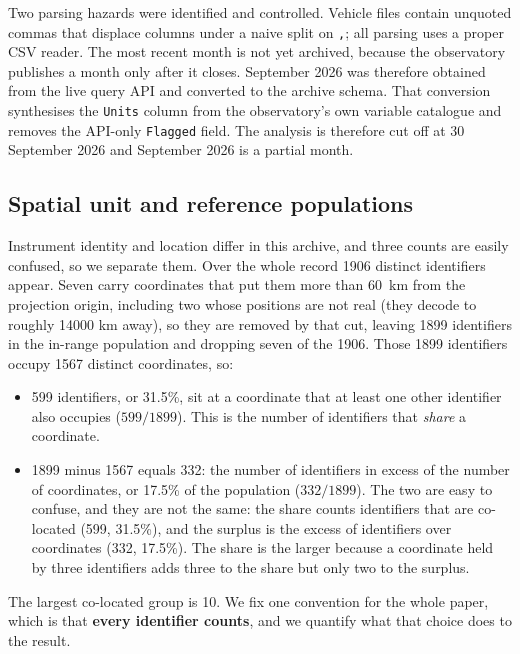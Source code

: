 \documentclass[fleqn,10pt,lineno]{wlpeerj}
\newcommand{\nAnalysed}{1899}
\newcommand{\nLocations}{1567}
\newcommand{\nShared}{599}
\newcommand{\nSurplus}{332}
\newcommand{\sharePct}{31.5}
\newcommand{\surplusPct}{17.5}
\newcommand{\maxCoLoc}{10}
\begin{document}
Two parsing hazards were identified and controlled. Vehicle files contain unquoted
commas that displace columns under a naive split on \texttt{,}; all parsing uses a
proper CSV reader. The most recent month is not yet archived, because the observatory publishes a month
only after it closes. September 2026 was therefore obtained from the live query API and
converted to the archive schema. That conversion synthesises the \texttt{Units} column
from the observatory's own variable catalogue and removes the API-only \texttt{Flagged}
field. The analysis is therefore cut off at 30 September 2026 and September 2026 is a
partial month.

\subsection*{Spatial unit and reference populations}
\label{sec:units}

Instrument identity and location differ in this archive, and three counts are easily
confused, so we separate them. Over the whole record \num{1906} distinct identifiers
appear. Seven carry coordinates that put them more than \SI{60}{\kilo\meter} from the
projection origin, including two whose positions are not real (they decode to roughly
14000 km away), so they are removed by that cut, leaving
\num{1899} identifiers in the in-range population and dropping seven of the 1906. Those
\num{1899} identifiers occupy
\nLocations{} distinct coordinates, so:
\begin{itemize}
\item \nShared{} identifiers, or \sharePct\%, sit at a coordinate that at least one other
identifier also occupies ($\nShared{}/\nAnalysed{}$). This is the number of identifiers that
\emph{share} a coordinate.
\item \nAnalysed{} minus \nLocations{} equals \nSurplus{}: the number of identifiers
in excess of the number of coordinates, or \surplusPct\% of the population
($\nSurplus{}/\nAnalysed{}$). The two are easy to confuse, and they are not the
same: the share counts identifiers that are co-located (\nShared{}, \sharePct\%), and the
surplus is the excess of identifiers over coordinates (\nSurplus{}, \surplusPct\%). The share
is the larger because a coordinate held by three identifiers adds three to the share but only
two to the surplus.
\end{itemize}
The largest co-located group is \maxCoLoc{}. We fix one convention for the whole paper,
which is that \textbf{every identifier counts}, and we quantify what that choice does to
the result.
\end{document}
